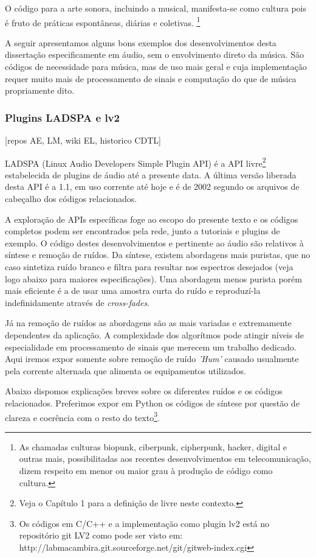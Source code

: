 O código para a arte sonora, incluindo a musical, manifesta-se como cultura pois é fruto de práticas
espontâneas, diárias e coletivas.
\footnote{As chamadas culturas biopunk, ciberpunk, cipherpunk, hacker,
  digital e outras mais, possibilitadas aos recentes desenvolvimentos
  em telecomunicação, dizem respeito em menor ou maior grau à produção
  de código como cultura.}

A seguir apresentamos alguns bons exemplos dos desenvolvimentos desta
dissertação especificamente em áudio, sem o envolvimento direto da
música. São códigos de necessidade para música, mas de uso mais geral
e cuja implementação requer muito mais de processamento de sinais e
computação do que de música propriamente dito.

\subsubsection{Plugins LADSPA e lv2}
      [repos AE, LM, wiki EL, historico CDTL] 

LADSPA (Linux Audio Developers Simple Plugin API) é a API
livre\footnote{Veja o Capítulo 1 para a definição de livre neste
  contexto.}  estabelecida de plugins de áudio até a presente data. A
última versão liberada desta API é a 1.1, em uso corrente até hoje e é
de 2002 segundo os arquivos de cabeçalho dos códigos relacionados.

A exploração de APIs específicas foge ao escopo do presente texto e os
códigos completos podem ser encontrados pela rede, junto a tutoriais e
plugins de exemplo. O código destes desenvolvimentos e pertinente ao
áudio são relativos à síntese e remoção de ruídos. Da síntese, existem
abordagens mais puristas, que no caso sintetiza ruído branco e filtra
para resultar nos espectros desejados (veja logo abaixo para maiores
especificações). Uma abordagem menos purista porém mais eficiente é a
de usar uma amostra curta do ruído e reproduzí-la indefinidamente
através de \emph{cross-fades}.

Já na remoção de ruídos as abordagens são as mais variadas e
extremamente dependentes da aplicação. A complexidade dos algorítmos
pode atingir níveis de especialidade em processamento de sinais que
merecem um trabalho dedicado. Aqui iremos expor somente sobre remoção
de ruído \emph{'Hum'} causado usualmente pela corrente alternada que
alimenta os equipamentos utilizados.

Abaixo dispomos explicações breves sobre os diferentes ruídos e os
códigos relacionados. Preferimos expor em Python os códigos de síntese
por questão de clareza e coerência com o resto do texto\footnote{Os
  códigos em C/C++ e a implementação como plugin lv2 está no
  repositório git LV2 como pode ser visto em:
  http://labmacambira.git.sourceforge.net/git/gitweb-index.cgi}.


